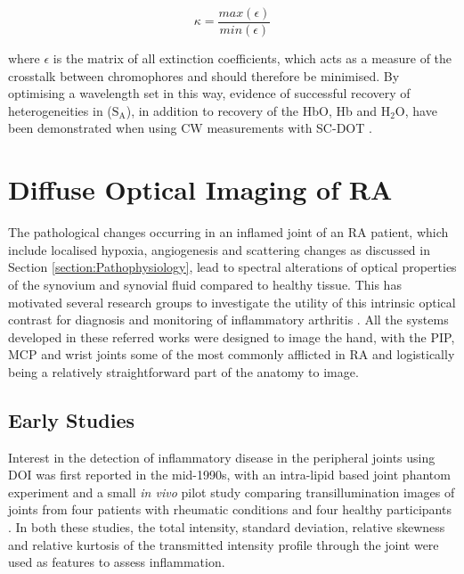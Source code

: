 \documentclass[twoside]{bhamthesis}
\theoremstyle{definition}
\begin{document}
\begin{equation}
\kappa = \frac{max\left( \textbf{$\epsilon$} \right)} {min\left( \textbf{$\epsilon$} \right)}
  \label{eqn:Lambert-Bouger}
\end{equation}

where $\textbf{$\epsilon$}$ is the matrix of all extinction coefficients, which acts as a measure of the crosstalk between chromophores and should therefore be minimised. By optimising a wavelength set in this way, evidence of successful recovery of heterogeneities in ($\mathrm{S_A}$), in addition to recovery of the HbO, Hb and $\mathrm{H_2O}$, have been demonstrated when using CW measurements with SC-DOT  \cite{corlu2005diffuse,eames2008wavelength}. 

\section{Diffuse Optical Imaging of RA}


\label{section:Optical_Imaging_of_Arthritis}

The pathological changes occurring in an inflamed joint of an RA patient, which include localised hypoxia, angiogenesis and scattering changes as discussed in Section 
\ref{section:Pathophysiology}, lead to spectral alterations of optical properties of the synovium and synovial fluid compared to healthy tissue. This has motivated several research groups to investigate the utility of this intrinsic optical contrast for diagnosis and monitoring of inflammatory arthritis \cite{hielscher2004sagittal,beuthan2007ra,minet2007analysis,meier2012potential}.  
All the systems developed in these referred works were designed to image the hand, with the PIP, MCP and wrist joints some of the most commonly afflicted in RA \cite{harris2005clinical} and logistically being a relatively straightforward part of the anatomy to image.

\subsection{Early Studies}

Interest in the detection of inflammatory disease in the peripheral joints using DOI was first reported in the mid-1990s, with an intra-lipid based joint phantom experiment \cite{prapavat1995evaluation} and a small \textit{in vivo} pilot study comparing transillumination images of joints from four patients with rheumatic conditions and four healthy participants \cite{prapavat1995vivo}. In both these studies, the total intensity, standard deviation, relative skewness and relative kurtosis of the transmitted intensity profile through the joint were used as features to assess inflammation. 
\end{document}
